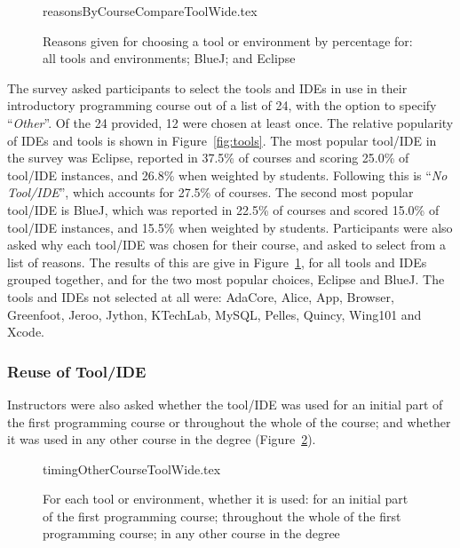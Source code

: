 \documentclass[english,submission]{programming}
\begin{document}
\begin{figure}
\begin{center}
{reasonsByCourseCompareToolWide.tex}
\end{center}
\caption{Reasons given for choosing a tool or environment by percentage for: all tools and environments; BlueJ; and Eclipse\label{fig:reasonsTools}}
\end{figure}

The survey asked participants to select the tools and IDEs in use in
their introductory programming course out of a list of 24, with the
option to specify ``{\emph{Other}}''. Of the 24 provided, 12 were
chosen at least once. The relative popularity of IDEs and tools is
shown in Figure~\ref{fig:tools}. The most popular tool/IDE in the
survey was Eclipse, reported in 37.5\% of courses and scoring 25.0\%
of tool/IDE instances, and 26.8\% when weighted by students. Following
this is ``{\emph{No Tool/IDE}}'', which accounts for 27.5\% of
courses. The second most popular tool/IDE is BlueJ, which was reported
in 22.5\% of courses and scored 15.0\% of tool/IDE instances, and
15.5\% when weighted by students. Participants were also asked why
each tool/IDE was chosen for their course, and asked to select from a
list of reasons. The results of this are give in
Figure~\ref{fig:reasonsTools}, for all tools and IDEs grouped
together, and for the two most popular choices, Eclipse and BlueJ. The
tools and IDEs not selected at all were: AdaCore, Alice, App, Browser,
Greenfoot, Jeroo, Jython, KTechLab, MySQL, Pelles, Quincy, Wing101 and
Xcode.

\subsubsection{Reuse of Tool/IDE}

Instructors were also asked whether the tool/IDE was used for an
initial part of the first programming course or throughout the whole
of the course; and whether it was used in any other course in the
degree (Figure~\ref{fig:toolreuse}). 

\begin{figure}
\begin{center}
{timingOtherCourseToolWide.tex}
\end{center}
\caption{For each tool or environment, whether it is used: for an initial part of the first programming course; throughout the whole of the first programming course; in any other course in the degree\label{fig:toolreuse}}
\end{figure}
\end{document}
